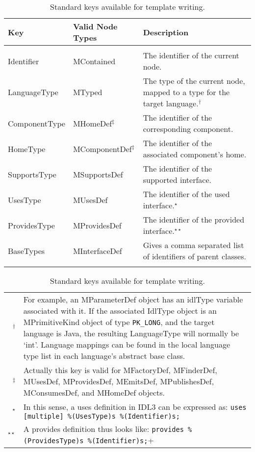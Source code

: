 \begin{table}[!htb]
\begin{minifbox}
\centering
\begin{tabular}{llp{}}
Key & Valid Node Types & Description \\ \hline \\
Identifier    & MContained               & The identifier of the current node. \\
LanguageType  & MTyped                   & The type of the current node, mapped to a type for the target language.$^\dagger$ \\
ComponentType & MHomeDef$^\ddagger$      & The identifier of the corresponding component. \\
HomeType      & MComponentDef$^\ddagger$ & The identifier of the associated component's home. \\
SupportsType  & MSupportsDef             & The identifier of the supported interface. \\
UsesType      & MUsesDef                 & The identifier of the used interface.$^\star$ \\
ProvidesType  & MProvidesDef             & The identifier of the provided interface.$^{\star\star}$ \\
BaseTypes     & MInterfaceDef            & Gives a comma separated list of identifiers of parent classes. \\ \\ \hline
\end{tabular}
\begin{tabular}{rp{}}
\\
$^\dagger$ & For example, an MParameterDef object has an idlType variable
associated with it. If the associated IdlType object is an MPrimitiveKind object
of type {\tt PK\_LONG}, and the target language is Java, the resulting
LanguageType will normally be `int'. Language mappings can be found in the local
language type list in each language's abstract base class. \\

$^\ddagger$ & Actually this key is valid for MFactoryDef, MFinderDef, MUsesDef,
MProvidesDef, MEmitsDef, MPublishesDef, MConsumesDef, and MHomeDef objects. \\

$^\star$ & In this sense, a uses definition in IDL3 can be expressed as:
\verb+uses [multiple] %(UsesType)s %(Identifier)s;+ \\

$^{\star\star}$ & A provides definition thus looks like:
\verb+provides %(ProvidesType)s %(Identifier)s;+
\end{tabular}
\end{minifbox}
\caption{Standard keys available for template writing.}
\label{table:component-template-keys}
\end{table}

